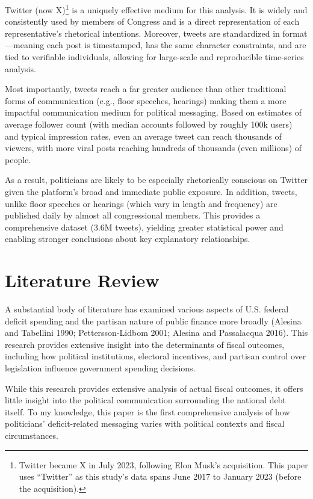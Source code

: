 \documentclass[
  12pt,
]{article}
\begin{document}
Twitter (now X)\footnote{Twitter became X in July 2023, following Elon
  Musk's acquisition. This paper uses ``Twitter'' as this study's data
  spans June 2017 to January 2023 (before the acquisition).} is a
uniquely effective medium for this analysis. It is widely and
consistently used by members of Congress and is a direct representation
of each representative's rhetorical intentions. Moreover, tweets are
standardized in format---meaning each post is timestamped, has the same
character constraints, and are tied to verifiable individuals, allowing
for large-scale and reproducible time-series analysis.

Most importantly, tweets reach a far greater audience than other
traditional forms of communication (e.g., floor speeches, hearings)
making them a more impactful communication medium for political
messaging. Based on estimates of average follower count (with median
accounts followed by roughly 100k users) and typical impression rates,
even an average tweet can reach thousands of viewers, with more viral
posts reaching hundreds of thousands (even millions) of people.

As a result, politicians are likely to be especially rhetorically
conscious on Twitter given the platform's broad and immediate public
exposure. In addition, tweets, unlike floor speeches or hearings (which
vary in length and frequency) are published daily by almost all
congressional members. This provides a comprehensive dataset (3.6M
tweets), yielding greater statistical power and enabling stronger
conclusions about key explanatory relationships.

\section{Literature Review}\label{literature-review}

A substantial body of literature has examined various aspects of U.S.
federal deficit spending and the partisan nature of public finance more
broadly (Alesina and Tabellini 1990; Pettersson-Lidbom 2001; Alesina and
Passalacqua 2016). This research provides extensive insight into the
determinants of fiscal outcomes, including how political institutions,
electoral incentives, and partisan control over legislation influence
government spending decisions.

While this research provides extensive analysis of actual fiscal
outcomes, it offers little insight into the political communication
surrounding the national debt itself. To my knowledge, this paper is the
first comprehensive analysis of how politicians' deficit-related
messaging varies with political contexts and fiscal circumstances.
\end{document}
